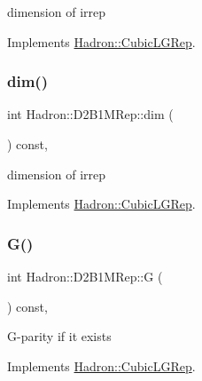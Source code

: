 dimension of irrep 

Implements \mbox{\hyperlink{structHadron_1_1CubicLGRep_a3acbaea26503ed64f20df693a48e4cdd}{Hadron\+::\+Cubic\+L\+G\+Rep}}.

\mbox{\label{structHadron_1_1D2B1MRep_a8d1c9f35b426e8848c73fa423f4f2a4b}} 
\subsubsection{\texorpdfstring{dim()}{dim()}\hspace{0.1cm}{\footnotesize\ttfamily [2/2]}}
{\footnotesize\ttfamily int Hadron\+::\+D2\+B1\+M\+Rep\+::dim (\begin{DoxyParamCaption}{ }\end{DoxyParamCaption}) const\hspace{0.3cm}{\ttfamily [inline]}, {\ttfamily [virtual]}}

dimension of irrep 

Implements \mbox{\hyperlink{structHadron_1_1CubicLGRep_a3acbaea26503ed64f20df693a48e4cdd}{Hadron\+::\+Cubic\+L\+G\+Rep}}.

\mbox{\label{structHadron_1_1D2B1MRep_abc6ac4ea31c661443bb658c8508bf378}} 
\subsubsection{\texorpdfstring{G()}{G()}\hspace{0.1cm}{\footnotesize\ttfamily [1/2]}}
{\footnotesize\ttfamily int Hadron\+::\+D2\+B1\+M\+Rep\+::G (\begin{DoxyParamCaption}{ }\end{DoxyParamCaption}) const\hspace{0.3cm}{\ttfamily [inline]}, {\ttfamily [virtual]}}

G-\/parity if it exists 

Implements \mbox{\hyperlink{structHadron_1_1CubicLGRep_ace26f7b2d55e3a668a14cb9026da5231}{Hadron\+::\+Cubic\+L\+G\+Rep}}.

\mbox{\label{structHadron_1_1D2B1MRep_abc6ac4ea31c661443bb658c8508bf378}} 
